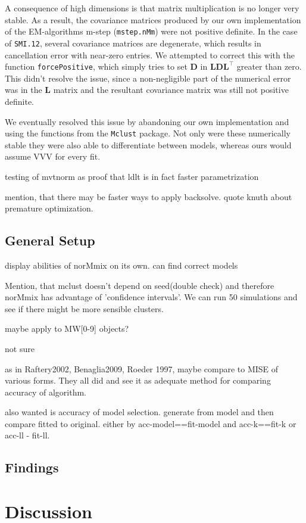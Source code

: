 A consequence of high dimensions is that matrix multiplication is no longer
very stable. As a result, the covariance matrices produced by our own 
implementation of the EM-algorithms m-step ({\tt mstep.nMm}) were not positive
definite.
In the case of {\tt SMI.12}, several covariance matrices are degenerate, which
results in cancellation error with near-zero entries.
We attempted to correct this with the function {\tt forcePositive}, which 
simply tries to set $\pmb{D}$ in $\pmb{LDL}^\top$ greater than zero.
This didn't resolve the issue, since a non-negligible part of the numerical
error was in the $\pmb{L}$ matrix and the resultant covariance matrix was still
not positive definite.

We eventually resolved this issue by abandoning our own implementation and 
using the functions from the {\tt Mclust} package. Not only were these 
numerically stable they were also able to differentiate between models, whereas
ours would assume VVV for every fit.

testing of mvtnorm as proof that ldlt is in fact faster parametrization

mention, that there may be faster ways to apply backsolve. 
quote knuth about premature optimization.

\section{General Setup}
display abilities of norMmix on its own. can find correct models

Mention, that mclust doesn't depend on seed(double check) and therefore norMmix has 
advantage of 'confidence intervals'. We can run 50 simulations and see if there
might be more sensible clusters.

maybe apply to MW[0-9] objects?

not sure

as in Raftery2002, Benaglia2009, Roeder 1997, maybe compare to MISE of various 
forms. They all did and see it as adequate method for comparing accuracy of 
algorithm.

also wanted is accuracy of model selection. generate from model and then compare
fitted to original. either by acc-model==fit-model and acc-k==fit-k or acc-ll - fit-ll.

\section{Findings}


\chapter{Discussion}

